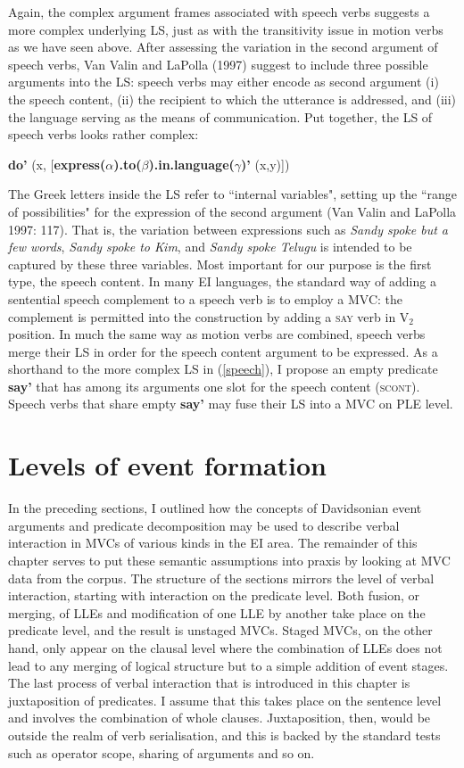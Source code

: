 Again, the complex argument frames associated with speech verbs suggests a more complex underlying LS, just as with the transitivity issue in motion verbs as we have seen above. After assessing the variation in the second argument of speech verbs, Van Valin and LaPolla (1997) suggest to include three possible arguments into the LS: speech verbs may either encode as second argument (i) the speech content, (ii) the recipient to which the utterance is addressed, and (iii) the language serving as the means of communication. Put together, the LS of speech verbs looks rather complex: 

\ea \label{speech}
\textbf{do'} (x, [\textbf{express($\alpha$).to($\beta$).in.language($\gamma$)'} (x,y)])
\z

The Greek letters inside the LS refer to ``internal variables", setting up the ``range of possibilities" for the expression of the second argument (Van Valin and LaPolla 1997: 117). That is, the variation between expressions such as \textit{Sandy spoke but a few words}, \textit{Sandy spoke to Kim}, and \textit{Sandy spoke Telugu} is intended to be captured by these three variables. Most important for our purpose is the first type, the speech content. In many EI languages, the standard way of adding a sentential speech complement to a speech verb is to employ a MVC: the complement is permitted into the construction by adding a \textsc{say} verb in V$_2$ position. In much the same way as motion verbs are combined, speech verbs merge their LS in order for the speech content argument to be expressed. As a shorthand to the more complex LS in (\ref{speech}), I propose an empty predicate \textbf{say'} that has among its arguments one slot for the speech content (\textsc{scont}). Speech verbs that share empty \textbf{say'} may fuse their LS into a MVC on PLE level.

\section{Levels of event formation}

In the preceding sections, I outlined how the concepts of Davidsonian event arguments and predicate decomposition may be used to describe verbal interaction in MVCs of various kinds in the EI area. The remainder of this chapter serves to put these semantic assumptions into praxis by looking at MVC data from the corpus. The structure of the sections mirrors the level of verbal interaction, starting with interaction on the predicate level. Both fusion, or merging, of LLEs and modification of one LLE by another take place on the predicate level, and the result is unstaged MVCs. Staged MVCs, on the other hand, only appear on the clausal level where the combination of LLEs does not lead to any merging of logical structure but to a simple addition of event stages. The last process of verbal interaction that is introduced in this chapter is juxtaposition of predicates. I assume that this takes place on the sentence level and involves the combination of whole clauses. Juxtaposition, then, would be outside the realm of verb serialisation, and this is backed by the standard tests such as operator scope, sharing of arguments and so on.

